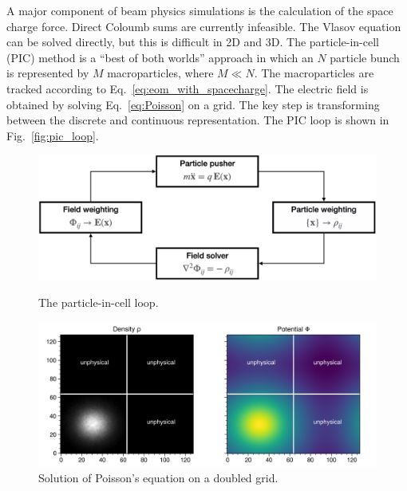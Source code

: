 A major component of beam physics simulations is the calculation of the space charge force. Direct Coloumb sums are currently infeasible. The Vlasov equation can be solved directly, but this is difficult in 2D and 3D. The particle-in-cell (PIC) method is a “best of both worlds” approach in which an $N$ particle bunch is represented by $M$ macroparticles, where $M \ll N$. The macroparticles are tracked according to Eq.~\eqref{eq:eom_with_spacecharge}. The electric field is obtained by solving Eq.~\eqref{eq:Poisson} on a grid. The key step is transforming between the discrete and continuous representation. The PIC loop is shown in Fig.~\ref{fig:pic_loop}. 
%
\begin{figure}[!p]
    \centering
    \includegraphics[width=\textwidth]{Images/chapter3/pic_loop.png}
    \caption{\label{fig:pic_loop}The particle-in-cell loop.}
    \vfill
    \vspace*{2.5cm}
    \vfill
    \includegraphics[width=\textwidth]{Images/chapter3/poisson.png}
    \caption{\label{fig:poisson}Solution of Poisson's equation on a doubled grid.}
    
\end{figure}
%

